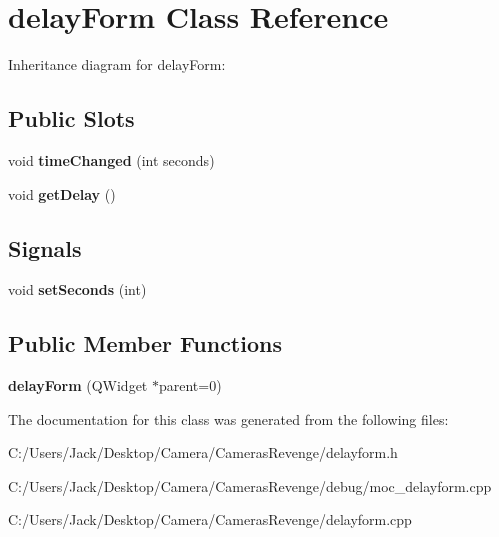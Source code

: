 \hypertarget{classdelay_form}{\section{delay\+Form Class Reference}
\label{classdelay_form}
}


Inheritance diagram for delay\+Form\+:
\subsection*{Public Slots}
\begin{DoxyCompactItemize}
\item 
\hypertarget{classdelay_form_a8131d9689ee9f1e69335f5e61d6812c6}{void {\bfseries time\+Changed} (int seconds)}\label{classdelay_form_a8131d9689ee9f1e69335f5e61d6812c6}

\item 
\hypertarget{classdelay_form_a0092ab36341ae159247749645247f0b5}{void {\bfseries get\+Delay} ()}\label{classdelay_form_a0092ab36341ae159247749645247f0b5}

\end{DoxyCompactItemize}
\subsection*{Signals}
\begin{DoxyCompactItemize}
\item 
\hypertarget{classdelay_form_a8e053d8ba195d1f86891be555b6b04cf}{void {\bfseries set\+Seconds} (int)}\label{classdelay_form_a8e053d8ba195d1f86891be555b6b04cf}

\end{DoxyCompactItemize}
\subsection*{Public Member Functions}
\begin{DoxyCompactItemize}
\item 
\hypertarget{classdelay_form_a5947109f139b20e44c0c1d4ae1f58da6}{{\bfseries delay\+Form} (Q\+Widget $\ast$parent=0)}\label{classdelay_form_a5947109f139b20e44c0c1d4ae1f58da6}

\end{DoxyCompactItemize}


The documentation for this class was generated from the following files\+:\begin{DoxyCompactItemize}
\item 
C\+:/\+Users/\+Jack/\+Desktop/\+Camera/\+Cameras\+Revenge/delayform.\+h\item 
C\+:/\+Users/\+Jack/\+Desktop/\+Camera/\+Cameras\+Revenge/debug/moc\+\_\+delayform.\+cpp\item 
C\+:/\+Users/\+Jack/\+Desktop/\+Camera/\+Cameras\+Revenge/delayform.\+cpp\end{DoxyCompactItemize}
